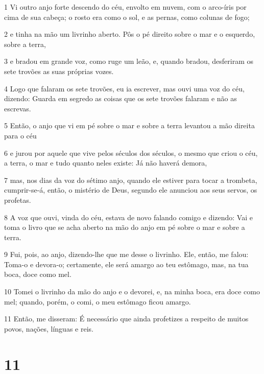 \par 1 Vi outro anjo forte descendo do céu, envolto em nuvem, com o arco-íris por cima de sua cabeça; o rosto era como o sol, e as pernas, como colunas de fogo;
\par 2 e tinha na mão um livrinho aberto. Pôs o pé direito sobre o mar e o esquerdo, sobre a terra,
\par 3 e bradou em grande voz, como ruge um leão, e, quando bradou, desferiram os sete trovões as suas próprias vozes.
\par 4 Logo que falaram os sete trovões, eu ia escrever, mas ouvi uma voz do céu, dizendo: Guarda em segredo as coisas que os sete trovões falaram e não as escrevas.
\par 5 Então, o anjo que vi em pé sobre o mar e sobre a terra levantou a mão direita para o céu
\par 6 e jurou por aquele que vive pelos séculos dos séculos, o mesmo que criou o céu, a terra, o mar e tudo quanto neles existe: Já não haverá demora,
\par 7 mas, nos dias da voz do sétimo anjo, quando ele estiver para tocar a trombeta, cumprir-se-á, então, o mistério de Deus, segundo ele anunciou aos seus servos, os profetas.
\par 8 A voz que ouvi, vinda do céu, estava de novo falando comigo e dizendo: Vai e toma o livro que se acha aberto na mão do anjo em pé sobre o mar e sobre a terra.
\par 9 Fui, pois, ao anjo, dizendo-lhe que me desse o livrinho. Ele, então, me falou: Toma-o e devora-o; certamente, ele será amargo ao teu estômago, mas, na tua boca, doce como mel.
\par 10 Tomei o livrinho da mão do anjo e o devorei, e, na minha boca, era doce como mel; quando, porém, o comi, o meu estômago ficou amargo.
\par 11 Então, me disseram: É necessário que ainda profetizes a respeito de muitos povos, nações, línguas e reis.

\chapter{11}

